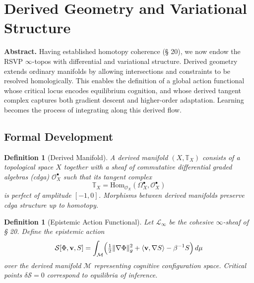 \documentclass[12pt,a4paper,twoside,openright]{book}
\newtheorem{definition}[theorem]{Definition}
\begin{document}

\section{Derived Geometry and Variational Structure}
\label{sec:derived}

\textbf{Abstract.}
Having established homotopy coherence (§ 20), we now endow the RSVP $\infty$-topos with differential and variational structure.  
Derived geometry extends ordinary manifolds by allowing intersections and constraints to be resolved homologically.  
This enables the definition of a global action functional whose critical locus encodes equilibrium cognition, and whose derived tangent complex captures both gradient descent and higher-order adaptation.  
Learning becomes the process of integrating along this derived flow.

\subsection*{Formal Development}

\begin{definition}[Derived Manifold]
A \emph{derived manifold} $(X,\mathbb{T}_X)$
consists of a topological space $X$ together with a sheaf of commutative differential graded algebras (cdga) $\mathcal{O}_X^\bullet$ such that its tangent complex
\[
\mathbb{T}_X = \mathrm{Hom}_{\mathcal{O}_X}(\Omega_X^\bullet,\mathcal{O}_X^\bullet)
\]
is perfect of amplitude $[-1,0]$.  
Morphisms between derived manifolds preserve cdga structure up to homotopy.
\end{definition}

\begin{definition}[Epistemic Action Functional]
Let $\mathcal{L}_\infty$ be the cohesive $\infty$-sheaf of § 20.
Define the \emph{epistemic action}
\[
\mathcal{S}[\Phi,\mathbf{v},S]
  = \int_{\mathcal{M}}
    \Bigl(
       \tfrac{1}{2}\| \nabla\Phi \|_g^2
       + \langle \mathbf{v},\nabla S\rangle
       - \beta^{-1}S
    \Bigr)\,d\mu
\]
over the derived manifold $\mathcal{M}$ representing cognitive configuration space.  
Critical points $\delta\mathcal{S}=0$ correspond to equilibria of inference.
\end{definition}
\end{document}
